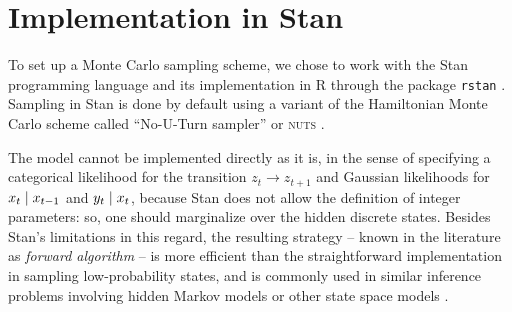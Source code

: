 \documentclass[10pt, twocolumn, headings=small, footlines=1, DIV=calc]{scrartcl}
\begin{document}
\section{Implementation in Stan}
To set up a Monte Carlo sampling scheme, we chose to work with the Stan
\autocite{Stan24} programming language and its implementation in R through the
package \texttt{rstan} \autocite{RStan24}. Sampling in Stan is done by default
using a variant of the Hamiltonian Monte Carlo scheme called \enquote{No-U-Turn
sampler} or \textsc{nuts} \autocite{Carpenter17}.

The model cannot be implemented directly as it is, in the sense of specifying a
categorical likelihood for the transition $z_{t} \to z_{t+1}$ and Gaussian
likelihoods for $x_{t} \;\vert\; x_{t-1}$ and $y_{t} \;\vert\; x_{t}$, because Stan
does not allow the definition of integer parameters: so, one should marginalize
over the hidden discrete states. Besides Stan’s limitations in this regard, the
resulting strategy -- known in the literature as \emph{forward algorithm} -- is
more efficient than the straightforward implementation in sampling
low-probability states, and is commonly used in similar inference problems
involving hidden Markov models or other state space models
\autocite{Damiano2018}.
\end{document}
